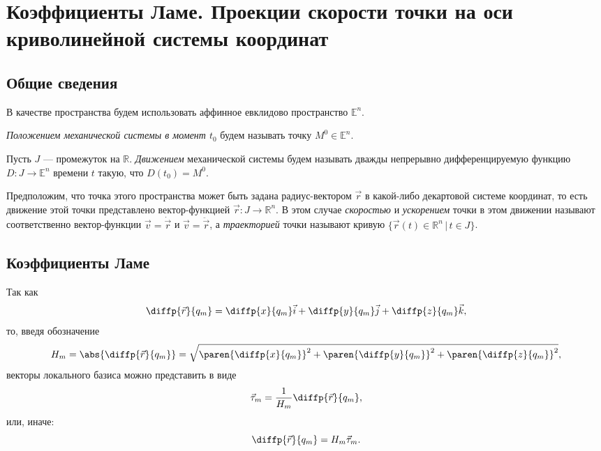 \section{Коэффициенты Ламе. Проекции скорости точки на оси криволинейной
системы координат}

\subsection{Общие сведения}

В качестве пространства будем использовать аффинное евклидово пространство
$\mathbb{E}^n$.

\begin{definition}
  \textit{Положением механической системы в момент $t_0$} будем называть точку
  $M^0 \in \mathbb{E}^n$.
\end{definition}

\begin{definition}
  Пусть $J$ --- промежуток на $\mathbb{R}$. \textit{Движением} механической
  системы будем называть дважды непрерывно дифференцируемую функцию $D : J \to
  \mathbb{E}^n$ времени $t$ такую, что $D(t_0) = M^0$.
\end{definition}

\begin{definition}
  Предположим, что точка этого пространства может быть задана радиус-вектором
  $\vec{r}$ в какой-либо декартовой системе координат, то есть движение этой
  точки представлено вектор-функцией $\vec{r} : J \to \mathbb{R}^n$. В этом
  случае \textit{скоростью} и \textit{ускорением} точки в этом движении
  называют соответственно вектор-функции $\vec{v} = \dot{\vec{r}}$ и
  $\vec{v} = \ddot{\vec{r}}$, а \textit{траекторией} точки называют кривую
  $\{ \vec{r}(t) \in \mathbb{R}^n \, | \, t \in J \}$.
\end{definition}


\subsection{Коэффициенты Ламе}

Так как
\begin{equation}
  \diffp{\vec{r}}{{q_m}} = \diffp{x}{{q_m}} \vec{i} + \diffp{y}{{q_m}} \vec{j} +
  \diffp{z}{{q_m}} \vec{k},
\end{equation}
то, введя обозначение
\begin{equation}
  H_m = \abs{\diffp{\vec{r}}{{q_m}}} = \sqrt{\paren{\diffp{x}{{q_m}}}^2 +
  \paren{\diffp{y}{{q_m}}}^2 + \paren{\diffp{z}{{q_m}}}^2},
\end{equation}
векторы локального базиса можно представить в виде
\begin{equation}
  \label{eq:local_basis_vec}
  \vec{\tau}_m = \frac{1}{H_m} \diffp{\vec{r}}{{q_m}},
\end{equation}
или, иначе:
\begin{equation}
  \label{eq:local_basis_vec_alt}
  \diffp{\vec{r}}{{q_m}} = H_m \vec{\tau}_m.
\end{equation}

